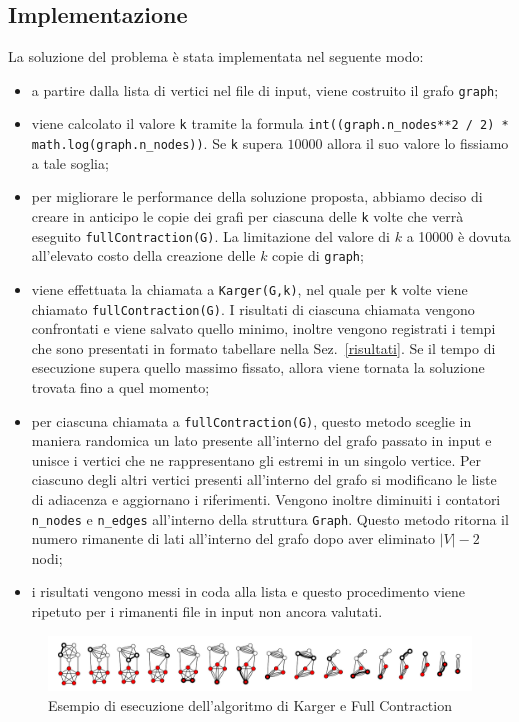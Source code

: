 \subsection{Implementazione}
	
	La soluzione del problema è stata implementata nel seguente modo:
	\begin{itemize}
		\item a partire dalla lista di vertici nel file di input, viene costruito il grafo \texttt{graph};
		\item viene calcolato il valore \texttt{k} tramite la formula \texttt{int((graph.n\_nodes**2 / 2) * \\
			math.log(graph.n\_nodes))}. Se \texttt{k} supera $10000$ allora il suo valore lo fissiamo a tale soglia;
		\item per migliorare le performance della soluzione proposta, abbiamo deciso di creare in anticipo le copie dei grafi per ciascuna delle \texttt{k} volte che verrà eseguito \texttt{fullContraction(G)}. La limitazione del valore di $k$ a 10000 è dovuta all'elevato costo della creazione delle $k$ copie di \texttt{graph};
		\item viene effettuata la chiamata a \texttt{Karger(G,k)}, nel quale per \texttt{k} volte viene chiamato \texttt{fullContraction(G)}. I risultati di ciascuna chiamata vengono confrontati e viene salvato quello minimo, inoltre vengono registrati i tempi che sono presentati in formato tabellare nella Sez.~\ref{risultati}. Se il tempo di esecuzione supera quello massimo fissato, allora viene tornata la soluzione trovata fino a quel momento;
		\item per ciascuna chiamata a \texttt{fullContraction(G)}, questo metodo sceglie in maniera randomica un lato presente all'interno del grafo passato in input e unisce i vertici che ne rappresentano gli estremi in un singolo vertice. Per ciascuno degli altri vertici presenti all'interno del grafo si modificano le liste di adiacenza e aggiornano i riferimenti. Vengono inoltre diminuiti i contatori \texttt{n\_nodes} e \texttt{n\_edges} all'interno della struttura \texttt{Graph}. Questo metodo ritorna il numero rimanente di lati all'interno del grafo dopo aver eliminato $|V|-2$ nodi;
		\item i risultati vengono messi in coda alla lista e questo procedimento viene ripetuto per i rimanenti file in input non ancora valutati.
	\end{itemize}

	\vspace{1cm}
	\begin{center}
		\begin{figure}[H]
			\centering
			\includegraphics[width=\linewidth]{Img/example_1.png}
			\caption{Esempio di esecuzione dell'algoritmo di Karger e Full Contraction}
		\end{figure}
	\end{center}
	\vspace{-1cm}
		
